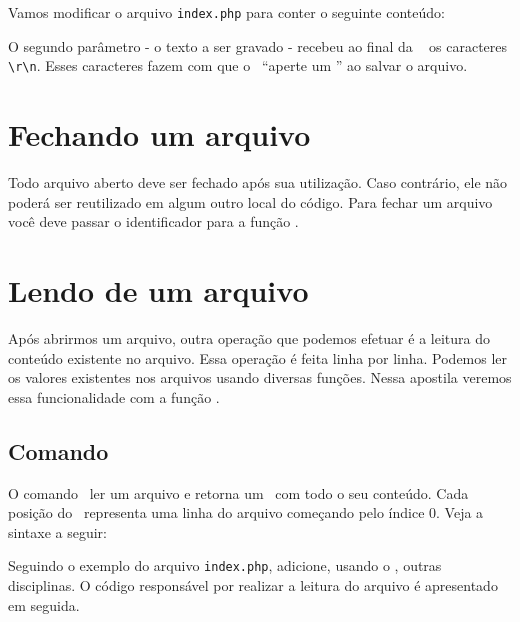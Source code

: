Vamos modificar o arquivo \texttt{index.php} para conter o seguinte conteúdo:



O segundo parâmetro - o texto a ser gravado - recebeu ao final da \tipostring~
os caracteres \texttt{\textbackslash r\textbackslash n}. Esses caracteres fazem com 
que o \php~``aperte um \enter'' ao salvar o arquivo.

\section{Fechando um arquivo}
\label{fechando-um-arquivo}

Todo arquivo aberto deve ser fechado após sua utilização. Caso contrário, ele não 
poderá ser reutilizado em algum outro local do código. Para fechar um arquivo
você deve passar o identificador para a função \funcaofclose.




\section{Lendo de um arquivo}
\label{lendo-de-um-arquivo}

Após abrirmos um arquivo, outra operação que podemos efetuar é a leitura do conteúdo 
existente no arquivo. Essa operação é feita linha por linha. Podemos ler os 
valores existentes nos arquivos usando diversas funções. Nessa apostila 
veremos essa funcionalidade com a função \funcaofile. 

\subsection{Comando \funcaofile}
\label{comando-file}

O comando \funcaofile~ler um arquivo e retorna um \tipoarray~com todo o seu conteúdo.
Cada posição do \tipoarray~representa uma linha do arquivo começando pelo índice
0. Veja a sintaxe a seguir:



Seguindo o exemplo do arquivo \texttt{index.php}, adicione, usando o \sublime,
outras disciplinas. O código responsável por realizar a leitura do arquivo é
apresentado em seguida.




